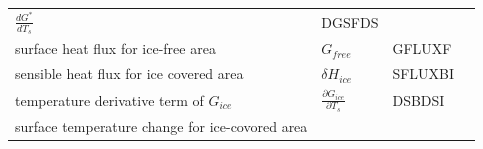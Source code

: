 \begin{longtable}[]{@{}llll@{}}
\begin{minipage}[t]{0.33\columnwidth}
\(\frac{dG^*}{dT_s}\)\strut
\end{minipage} & \begin{minipage}[t]{0.08\columnwidth}\raggedright
DGSFDS\strut
\end{minipage} & \begin{minipage}[t]{0.09\columnwidth}\raggedright
\strut
\end{minipage}\tabularnewline
\begin{minipage}[t]{0.39\columnwidth}\raggedright
surface heat flux for ice-free area\strut
\end{minipage} & \begin{minipage}[t]{0.33\columnwidth}\raggedright
\(G_{free}\)\strut
\end{minipage} & \begin{minipage}[t]{0.08\columnwidth}\raggedright
GFLUXF\strut
\end{minipage} & \begin{minipage}[t]{0.09\columnwidth}\raggedright
\strut
\end{minipage}\tabularnewline
\begin{minipage}[t]{0.39\columnwidth}\raggedright
sensible heat flux for ice covered area\strut
\end{minipage} & \begin{minipage}[t]{0.33\columnwidth}\raggedright
\(\delta H_{ice}\)\strut
\end{minipage} & \begin{minipage}[t]{0.08\columnwidth}\raggedright
SFLUXBI\strut
\end{minipage} & \begin{minipage}[t]{0.09\columnwidth}\raggedright
\strut
\end{minipage}\tabularnewline
\begin{minipage}[t]{0.39\columnwidth}\raggedright
temperature derivative term of \(G_{ice}\)\strut
\end{minipage} & \begin{minipage}[t]{0.33\columnwidth}\raggedright
\(\frac{\partial G_{ice}}{\partial T_s}\)\strut
\end{minipage} & \begin{minipage}[t]{0.08\columnwidth}\raggedright
DSBDSI\strut
\end{minipage} & \begin{minipage}[t]{0.09\columnwidth}\raggedright
\strut
\end{minipage}\tabularnewline
\begin{minipage}[t]{0.39\columnwidth}\raggedright
surface temperature change for ice-covored area\strut

\end{minipage}
\end{longtable}
